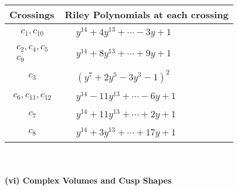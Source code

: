 \documentclass[1p]{elsarticle_modified}
\theoremstyle{definition}
\begin{document}
\begin{tabular}{m{50pt}|m{274pt}}
Crossings & \hspace{64pt}Riley Polynomials at each crossing \\
\hline $$\begin{aligned}c_{1},c_{10}\end{aligned}$$&$\begin{aligned}
&y^{14}+4 y^{13}+\cdots-3 y+1
\end{aligned}$\\
\hline $$\begin{aligned}c_{2},c_{4},c_{5}\\c_{9}\end{aligned}$$&$\begin{aligned}
&y^{14}+8 y^{13}+\cdots+9 y+1
\end{aligned}$\\
\hline $$\begin{aligned}c_{3}\end{aligned}$$&$\begin{aligned}
&(y^7+2 y^5-3 y^3-1)^2
\end{aligned}$\\
\hline $$\begin{aligned}c_{6},c_{11},c_{12}\end{aligned}$$&$\begin{aligned}
&y^{14}-11 y^{13}+\cdots-6 y+1
\end{aligned}$\\
\hline $$\begin{aligned}c_{7}\end{aligned}$$&$\begin{aligned}
&y^{14}+11 y^{13}+\cdots+2 y+1
\end{aligned}$\\
\hline $$\begin{aligned}c_{8}\end{aligned}$$&$\begin{aligned}
&y^{14}+3 y^{13}+\cdots+17 y+1
\end{aligned}$\\
\hline
\end{tabular}\\~\\
\newpage\flushleft \textbf{(vi) Complex Volumes and Cusp Shapes}
\end{document}
